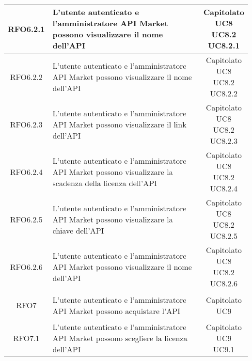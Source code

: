 \begin{longtable}{|c|p{8cm}|c|}
\hypertarget{RFO6.2.1}{RFO6.2.1} &  L'utente autenticato e l'amministratore API Market possono visualizzare il nome dell'API & \makecell*{Capitolato\\UC8\\UC8.2\\UC8.2.1} \\
\hline

\hypertarget{RFO6.2.2}{RFO6.2.2} &  L'utente autenticato e l'amministratore API Market possono visualizzare il nome dell'API & \makecell*{Capitolato\\UC8\\UC8.2\\UC8.2.2} \\
\hline

\hypertarget{RFO6.2.3}{RFO6.2.3} &  L'utente autenticato e l'amministratore API Market possono visualizzare il link dell'API & \makecell*{Capitolato\\UC8\\UC8.2\\UC8.2.3} \\
\hline

\hypertarget{RFO6.2.4}{RFO6.2.4} &  L'utente autenticato e l'amministratore API Market possono visualizzare la scadenza della licenza dell'API & \makecell*{Capitolato\\UC8\\UC8.2\\UC8.2.4} \\
\hline

\hypertarget{RFO6.2.5}{RFO6.2.5} &  L'utente autenticato e l'amministratore API Market possono visualizzare la chiave dell'API & \makecell*{Capitolato\\UC8\\UC8.2\\UC8.2.5} \\
\hline

\hypertarget{RFO6.2.6}{RFO6.2.6} &  L'utente autenticato e l'amministratore API Market possono visualizzare il nome dell'API & \makecell*{Capitolato\\UC8\\UC8.2\\UC8.2.6} \\
\hline

\hypertarget{RFO7}{RFO7} & L'utente autenticato e l'amministratore API Market possono acquistare l'API & \makecell*{Capitolato\\UC9} \\
\hline

\hypertarget{RFO7.1}{RFO7.1} &  L'utente autenticato e l'amministratore API Market possono scegliere la licenza dell'API & \makecell*{Capitolato\\UC9\\UC9.1} \\
\hline


\end{longtable}

